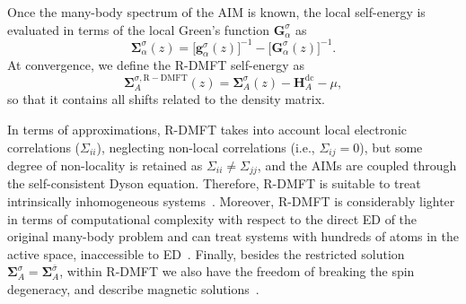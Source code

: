 \documentclass[aps,prx,twocolumn,superscriptaddress]{revtex4-2}
\begin{document}
Once the many-body spectrum of the AIM is known, the local self-energy is evaluated in terms of the local Green's function $\mathbf{G}^{\sigma}_{\alpha}$ as 
\begin{equation}
    \mathbf{\Sigma}^{\sigma}_{\alpha}(z) = \big[\mathbf{g}^{\sigma}_{\alpha}(z)\big]^{-1}-\big[\mathbf{G}^{\sigma}_{\alpha}(z)\big]^{-1}. 
\end{equation}
At convergence, we define the R-DMFT self-energy as 
\begin{equation} \label{eq:SigmaDMFT}
    \mathbf{\Sigma}^{\sigma,\mathrm{R-DMFT}}_A(z) = \mathbf{\Sigma}^{\sigma}_A(z) - \mathbf{H}^{\mathrm{dc}}_A - \mu,
\end{equation}
so that it contains all shifts related to the density matrix. 


In terms of approximations, R-DMFT takes into account local electronic correlations ($\Sigma_{ii}$),
neglecting non-local correlations (i.e., $\Sigma_{ij}=0$), 
but some degree of non-locality is retained as $\Sigma_{ii}\neq\Sigma_{jj}$, 
and the AIMs are coupled through the self-consistent Dyson equation. 
Therefore, R-DMFT is suitable to treat intrinsically 
inhomogeneous systems~\cite{valliPRB86,dasPRL107,valliPRB82,kropfPRB100,baumannPRA101,jacobPRB82}.
Moreover, R-DMFT is considerably lighter in terms of computational complexity 
with respect to the direct ED of the original many-body problem 
and can treat systems with hundreds of atoms in the active space, inaccessible to ED~\cite{snoekNJP10,valliPRB82,valliPRB86}.
Finally, besides the restricted solution $\mathbf{\Sigma}_A^{\sigma}=\mathbf{\Sigma}_A^{\bar\sigma}$, within R-DMFT we  also have the freedom of breaking the spin degeneracy, 
and describe magnetic solutions~\cite{snoekNJP10,valliPRB94,valliNL18,valliPRB100,amaricciPRB98}.
\end{document}
